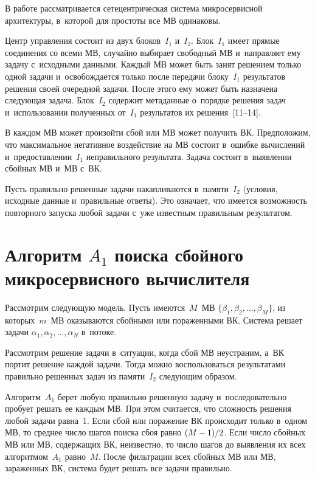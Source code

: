 \begin{multicols}{2}
  В работе рассматривается сетецентрическая сис\-те\-ма микросервисной 
архитектуры, в~которой для простоты все МВ 
одинаковы. 
  
  Центр управления состоит из двух блоков~$I_1$ и~$I_2$. Блок~$I_1$ имеет 
прямые соединения со всеми МВ, случайно выбирает свободный МВ и~направляет 
ему задачу с~исходными данными. Каждый МВ может быть занят решением 
только одной задачи и~освобождается только после передачи блоку~$I_1$ 
результатов решения своей очередной задачи. После этого ему может быть 
назначена следующая задача. Блок~$I_2$ содержит метаданные о~порядке 
решения задач и~использовании полученных от~$I_1$ результатов их 
решения~[11--14]. 
  
  В каждом МВ может произойти сбой или МВ может получить ВК. Предположим, что максимальное негативное воздействие на МВ состоит 
в~ошибке вычислений и~предоставлении~$I_1$ неправильного результата. Задача 
состоит в~выявлении сбойных МВ и~МВ с~ВК. 
  
  Пусть правильно решенные задачи накапливаются в~памяти~$I_2$ (условия, 
исходные данные и~правильные ответы). Это означает, что имеется возможность 
повторного запуска любой задачи с~уже известным правильным результатом.
  
  \section{Алгоритм $A_1$ поиска сбойного микросервисного 
вычислителя}
  
  Рассмотрим следующую модель. Пусть имеются~$M$~МВ
 $\{ \beta_1, \beta_2, \ldots , \beta_M\}$, из которых~$m$~МВ 
оказываются сбойными или пораженными ВК. Система решает задачи $\alpha_1, 
\alpha_2, \ldots , \alpha_N$ в~потоке.
  
  Рассмотрим решение задачи в~ситуации, когда сбой МВ неустраним, а~ВК 
портит решение каждой задачи. Тогда можно воспользоваться результатами 
правильно решенных задач из памяти~$I_2$ сле\-ду\-ющим образом. 
  
  Алгоритм~$A_1$ берет любую правильно решенную задачу и~последовательно 
пробует решать ее каждым МВ. При этом считается, что сложность решения 
любой задачи равна~1. Если сбой или поражение ВК происходит только в~одном 
МВ, то среднее число шагов поиска сбоя равно $(M\hm-1)/2$. Если число сбойных 
МВ или МВ, содержащих ВК, неизвестно, то число шагов до выявления их всех 
алгоритмом~$A_1$ равно~$M$. После фильтрации всех сбойных МВ или МВ, 
зараженных ВК, система будет решать все задачи правильно.
  

\end{multicols}
